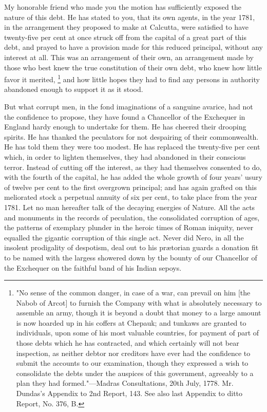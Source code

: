My honorable friend who made you the motion has sufficiently exposed the nature of this debt. He has stated to you, that its own agents, in the year 1781, in the arrangement they proposed to make at Calcutta, were satisfied to have twenty-five per cent at once struck off from the capital of a great part of this debt, and prayed to have a provision made for this reduced principal, without any interest at all. This was an arrangement of their own, an arrangement made by those who best knew the true constitution of their own debt, who knew how little favor it merited,
\footnote{ "No sense of the common danger, in case of a war, can prevail on him [the Nabob of Arcot] to furnish the Company with what is absolutely necessary to assemble an army, though it is beyond a doubt that money to a large amount is now hoarded up in his coffers at Chepauk; and tunkaws are granted to individuals, upon some of his most valuable countries, for payment of part of those debts which he has contracted, and which certainly will not bear inspection, as neither debtor nor creditors have ever had the confidence to submit the accounts to our examination, though they expressed a wish to consolidate the debts under the auspices of this government, agreeably to a plan they had formed."—Madras Consultations, 20th July, 1778. Mr. Dundas's Appendix to 2nd Report, 143. See also last Appendix to ditto Report, No. 376, B.}
 and how little hopes they had to find any persons in authority abandoned enough to support it as it stood.

But what corrupt men, in the fond imaginations of a sanguine avarice, had not the confidence to propose, they have found a Chancellor of the Exchequer in England hardy enough to undertake for them. He has cheered their drooping spirits. He has thanked the peculators for not despairing of their commonwealth. He has told them they were too modest. He has replaced the twenty-five per cent which, in order to lighten themselves, they had abandoned in their conscious terror. Instead of cutting off the interest, as they had themselves consented to do, with the fourth of the capital, he has added the whole growth of four years' usury of twelve per cent to the first overgrown principal; and has again grafted on this meliorated stock a perpetual annuity of six per cent, to take place from the year 1781. Let no man hereafter talk of the decaying energies of Nature. All the acts and monuments in the records of peculation, the consolidated corruption of ages, the patterns of exemplary plunder in the heroic times of Roman iniquity, never equalled the gigantic corruption of this single act. Never did Nero, in all the insolent prodigality of despotism, deal out to his prætorian guards a donation fit to be named with the largess showered down by the bounty of our Chancellor of the Exchequer on the faithful band of his Indian sepoys.

